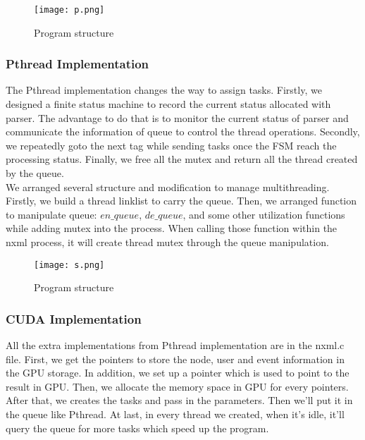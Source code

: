 \documentclass[10pt,twocolumn,letterpaper]{article}
\numberwithin{figure}{section}
\begin{document}
\begin{figure}[h]
    \centering
    \texttt{[image: p.png]}
    \caption{Program structure}
    \label{fig:my_label}
\end{figure}

\subsubsection{Pthread Implementation}

The Pthread implementation changes the way to assign tasks. Firstly, we designed a finite status machine to record the current status allocated with parser. The advantage to do that is to monitor the current status of parser and communicate the information of queue to control the thread operations. Secondly, we repeatedly goto the next tag while sending tasks once the FSM reach the processing status. Finally, we free all the mutex and return all the thread created by the queue.\\
We arranged several structure and modification to manage multithreading. Firstly, we build a thread linklist to carry the queue. Then, we arranged function to manipulate queue: $en\_queue$, $de\_queue$, and some other utilization functions while adding mutex into the process. When calling those function within the nxml process, it will create thread mutex through the queue manipulation.

\begin{figure}[h]
    \centering
    \texttt{[image: s.png]}
    \caption{Program structure}
    \label{fig:my_label}
\end{figure}

\subsubsection{CUDA Implementation}

All the extra implementations from Pthread implementation are in the nxml.c file.
First, we get the pointers to store the node, user and event information in the GPU storage. In addition, we set up a pointer which is used to point to the result in GPU.
Then, we allocate the memory space in GPU for every pointers. 
After that, we creates the tasks and pass in the parameters.
Then we'll put it in the queue like Pthread.
At last, in every thread we created, when it's idle, it'll query the queue for more tasks which speed up the program. %

\end{document}
